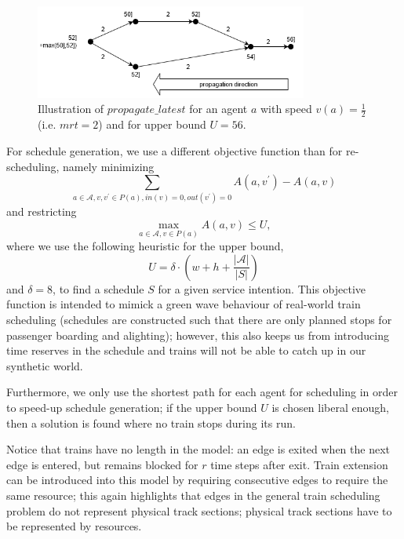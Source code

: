 \documentclass{article}
\begin{document}
\begin{figure}[hbtp]
	\centering
  \includegraphics[width=0.8\textwidth]{H1_propagate_latest.png}
	\caption{Illustration of $propagate\_latest$ for an agent $a$ with speed $v(a)=\frac{1}{2}$ (i.e. $mrt=2$) and for upper bound $U=56$.}
	\label{fig:propagate_latest}
\end{figure}





For schedule generation, we use a different objective function than for re-scheduling, namely minimizing
\begin{equation}
\sum_{a \in \mathcal{A}, v,v^\prime \in P(a), in(v)=0, out(v^\prime)=0} A(a,v^\prime) - A(a,v)
\end{equation}
and restricting
\begin{equation}
\max_{a \in \mathcal{A}, v \in P(a)} A(a,v) \leq U,
\end{equation}
where we use the following heuristic for the upper bound,
\begin{equation}
U=\delta \cdot  \left(w + h + \frac{\left|\mathcal{A}\right|}{\left| S \right|} \right)
\end{equation}
and $\delta=8$,
to find a schedule $S$ for a given service intention. This objective function is intended to mimick a green wave behaviour of real-world train scheduling (schedules are constructed such that there are only planned stops for passenger boarding and alighting); however, this also keeps us from introducing time reserves in the schedule and trains will not be able to catch up in our synthetic world.

Furthermore, we only use the shortest path for each agent for scheduling in order to speed-up schedule generation; if the upper bound $U$ is chosen liberal enough, then a solution is found where no train stops during its run.


Notice that trains have no length in the model: an edge is exited when the next edge is entered, but remains blocked for $r$ time steps after exit. Train extension can be introduced into this model by requiring consecutive edges to require the same resource; this again highlights that edges in the general train scheduling problem do not represent physical track sections; physical track sections have to be represented by resources.
\end{document}
